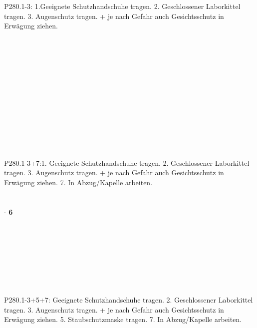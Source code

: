 \documentclass[12pt,a4paper,titlepage,headinclude,bibtotoc]{scrartcl}
\begin{document}
\textbf{}\\
\\
\\
\\
\\
\\
\\
P280.1-3: 1.Geeignete Schutzhandschuhe tragen.
2. Geschlossener Laborkittel tragen.
3. Augenschutz tragen. + je nach Gefahr auch Gesichtsschutz in Erwägung ziehen.\\
\\
\\
\\\\

\textbf{}\\
\\
\\
\\
\\
\\
\\
\\
\\
P280.1-3+7:1. Geeignete Schutzhandschuhe tragen.
2. Geschlossener Laborkittel tragen.
3. Augenschutz tragen. + je nach Gefahr auch Gesichtsschutz in Erwägung ziehen. 
7. In Abzug/Kapelle arbeiten.
\\
   \\\\

\textbf{ $\cdot$ 6}\\
\\
\\
\\
\\
\\
\\
\\  
\\
P280.1-3+5+7: Geeignete Schutzhandschuhe tragen.
2. Geschlossener Laborkittel tragen.
3. Augenschutz tragen. + je nach Gefahr auch Gesichtsschutz in Erwägung ziehen.
5. Staubschutzmaske tragen.  
7. In Abzug/Kapelle arbeiten.\\
\\
  \\\\
\end{document}
